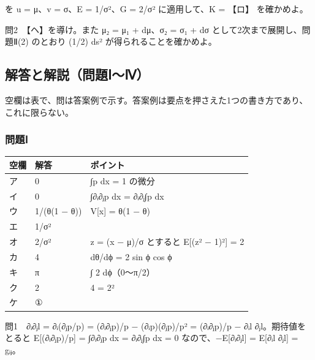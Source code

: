 \documentclass[
  10pt,
  a4paper,
]{article}
\begin{document}
を u = μ、v = σ、E = 1/σ²、G = 2/σ² に適用して、K = 【ロ】 を確かめよ。

問2　【ヘ】を導け。また μ{\fallbackfont ₂} = μ{\fallbackfont ₁} +
dμ、σ{\fallbackfont ₂} = σ{\fallbackfont ₁} + dσ
として2次まで展開し、問題Ⅱ(2) のとおり (1/2) ds²
が得られることを確かめよ。

\hypertarget{ux89e3ux7b54ux3068ux89e3ux8aacux554fux984cux2170ux2173}{%
\subsection{解答と解説（問題Ⅰ〜Ⅳ）}\label{ux89e3ux7b54ux3068ux89e3ux8aacux554fux984cux2170ux2173}}

空欄は表で、問は答案例で示す。答案例は要点を押さえた1つの書き方であり、これに限らない。

\hypertarget{ux554fux984cux2170}{%
\subsubsection{問題Ⅰ}\label{ux554fux984cux2170}}

\begin{longtable}[]{@{}lll@{}}
\toprule\noalign{}
空欄 & 解答 & ポイント \\
\midrule\noalign{}
\endhead
\bottomrule\noalign{}
\endlastfoot
ア & 0 & ∫p dx = 1 の微分 \\
イ & 0 & ∫∂{\fallbackfont ᵢ}∂{\fallbackfont ⱼ}p dx =
∂{\fallbackfont ᵢ}∂{\fallbackfont ⱼ}∫p dx \\
ウ & 1/(θ(1 − θ)) & V{[}x{]} = θ(1 − θ) \\
エ & 1/σ² & \\
オ & 2/σ² & z = (x − μ)/σ とすると E{[}(z² − 1)²{]} = 2 \\
カ & 4 & dθ/d{\fallbackfont ϕ} = 2 sin {\fallbackfont ϕ} cos
{\fallbackfont ϕ} \\
キ & π & ∫ 2 d{\fallbackfont ϕ}（0〜π/2） \\
ク & 2 & 4 = 2² \\
ケ & ① & \\
\end{longtable}

問1　∂{\fallbackfont ᵢ}∂{\fallbackfont ⱼ}l =
∂{\fallbackfont ᵢ}(∂{\fallbackfont ⱼ}p/p) =
(∂{\fallbackfont ᵢ}∂{\fallbackfont ⱼ}p)/p −
(∂{\fallbackfont ᵢ}p)(∂{\fallbackfont ⱼ}p)/p² =
(∂{\fallbackfont ᵢ}∂{\fallbackfont ⱼ}p)/p − ∂{\fallbackfont ᵢ}l
∂{\fallbackfont ⱼ}l。期待値をとると
E{[}(∂{\fallbackfont ᵢ}∂{\fallbackfont ⱼ}p)/p{]} =
∫∂{\fallbackfont ᵢ}∂{\fallbackfont ⱼ}p dx =
∂{\fallbackfont ᵢ}∂{\fallbackfont ⱼ}∫p dx = 0
なので、−E{[}∂{\fallbackfont ᵢ}∂{\fallbackfont ⱼ}l{]} =
E{[}∂{\fallbackfont ᵢ}l ∂{\fallbackfont ⱼ}l{]} = g{\fallbackfont ᵢⱼ}。
\end{document}
